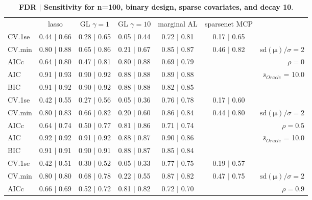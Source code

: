 \clearpage
\begin{table}\vspace{-.5cm}
\caption[l]{ {\it }
{ \bf FDR $\boldsymbol{\mid}$ Sensitivity for n=100, binary design, sparse covariates, and  decay  10}.}
\vspace{-.5cm}
\footnotesize{}
\begin{center}
\begin{tabular}{l*{5}{c}|r}
 & lasso & GL $\gamma=1$ & GL $\gamma=10$ & marginal AL & sparsenet MCP  & \\
 \cline{1-7}
CV.1se & 0.44 $\mid$ 0.66 & 0.28 $\mid$ 0.65 & 0.05 $\mid$ 0.44 & 0.72 $\mid$ 0.81 & 0.17 $\mid$ 0.65 & \\
CV.min & 0.80 $\mid$ 0.88 & 0.65 $\mid$ 0.86 & 0.21 $\mid$ 0.67 & 0.85 $\mid$ 0.87 & 0.46 $\mid$ 0.82 &  $\mathrm{sd}(\mathbf{\mu})/\sigma=2$ \\
AICc & 0.64 $\mid$ 0.80 & 0.47 $\mid$ 0.81 & 0.80 $\mid$ 0.88 & 0.69 $\mid$ 0.79 & & $\rho=0$ \\
AIC & 0.91 $\mid$ 0.93 & 0.90 $\mid$ 0.92 & 0.88 $\mid$ 0.88 & 0.89 $\mid$ 0.88 & &  \multirow{2}{*}{$\bar{s}_{Oracle}$ = 10.0} \\
BIC & 0.91 $\mid$ 0.92 & 0.90 $\mid$ 0.92 & 0.88 $\mid$ 0.88 & 0.82 $\mid$ 0.85 & &  \\
 \hline 
CV.1se & 0.42 $\mid$ 0.55 & 0.27 $\mid$ 0.56 & 0.05 $\mid$ 0.36 & 0.76 $\mid$ 0.78 & 0.17 $\mid$ 0.60 & \\
CV.min & 0.80 $\mid$ 0.83 & 0.66 $\mid$ 0.82 & 0.20 $\mid$ 0.60 & 0.86 $\mid$ 0.84 & 0.44 $\mid$ 0.80 &  $\mathrm{sd}(\mathbf{\mu})/\sigma=2$ \\
AICc & 0.64 $\mid$ 0.74 & 0.50 $\mid$ 0.77 & 0.81 $\mid$ 0.86 & 0.71 $\mid$ 0.74 & & $\rho=0.5$ \\
AIC & 0.92 $\mid$ 0.92 & 0.91 $\mid$ 0.92 & 0.88 $\mid$ 0.87 & 0.90 $\mid$ 0.86 & &  \multirow{2}{*}{$\bar{s}_{Oracle}$ = 10.0} \\
BIC & 0.91 $\mid$ 0.91 & 0.90 $\mid$ 0.91 & 0.88 $\mid$ 0.87 & 0.85 $\mid$ 0.84 & &  \\
 \hline 
CV.1se & 0.42 $\mid$ 0.51 & 0.30 $\mid$ 0.52 & 0.05 $\mid$ 0.33 & 0.77 $\mid$ 0.75 & 0.19 $\mid$ 0.57 & \\
CV.min & 0.80 $\mid$ 0.80 & 0.68 $\mid$ 0.78 & 0.22 $\mid$ 0.55 & 0.87 $\mid$ 0.82 & 0.47 $\mid$ 0.75 &  $\mathrm{sd}(\mathbf{\mu})/\sigma=2$ \\
AICc & 0.66 $\mid$ 0.69 & 0.52 $\mid$ 0.72 & 0.81 $\mid$ 0.82 & 0.72 $\mid$ 0.70 & & $\rho=0.9$ \\

\end{tabular}
\end{center}
\end{table}
